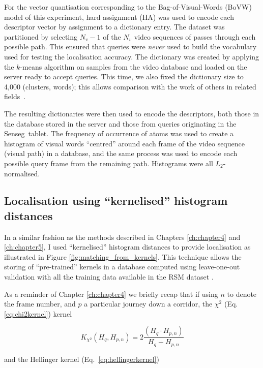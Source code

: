 For the vector quantisation corresponding to the Bag-of-Visual-Words (BoVW) model of this experiment, hard assignment (HA) was used to encode each descriptor vector by assignment to a dictionary entry. The dataset was partitioned by selecting $N_v-1$ of the $N_v$ video sequences of passes through each possible path. This ensured that queries were {\em never} used to build the vocabulary used for testing the localisation accuracy. The dictionary was created by applying the $k$-means algorithm on samples from the video database and loaded on the server ready to accept queries. This time, we also fixed the dictionary size to 4,000 (clusters, words); this allows comparison with the work of others in related fields~\cite{Chatfield2011}.

The resulting dictionaries were then used to encode the descriptors, both those in the database stored in the server and those from queries originating in the Senseg\texttrademark\ tablet.  The frequency of occurrence of atoms was used to create a histogram of visual words ``centred'' around each frame of the video sequence (visual path) in a database, and the same process was used to encode each possible query frame from the remaining path. Histograms were all $L_2$-normalised.

\subsection{Localisation using ``kernelised'' histogram distances}
\label{sec:methods}

In a similar fashion as the methods described in Chapters \ref{ch:chapter4} and \ref{ch:chapter5}, I used ``kernelised'' histogram distances  to provide localisation as illustrated in Figure \ref{fig:matching_from_kernels}. This technique allows the storing of ``pre-trained'' kernels in a database computed using leave-one-out validation with all the training data available in the RSM dataset \citep{Rivera-RubioRSM}.

As a reminder of Chapter \ref{ch:chapter4} we briefly recap that if using $n$ to denote the frame number, and $p$ a particular journey down a corridor, the 
$\chi^2$ (Eq.\ref{eq:chi2kernel}) kernel

\begin{equation}
K_{\chi^2}(H_q, H_{p,n}) =  2 \frac{(H_q \cdot H_{p,n})}{H_q+H_{p,n}}
\label{eq:chi2kernel}
\end{equation}

and the Hellinger kernel (Eq.~\ref{eq:hellingerkernel})

